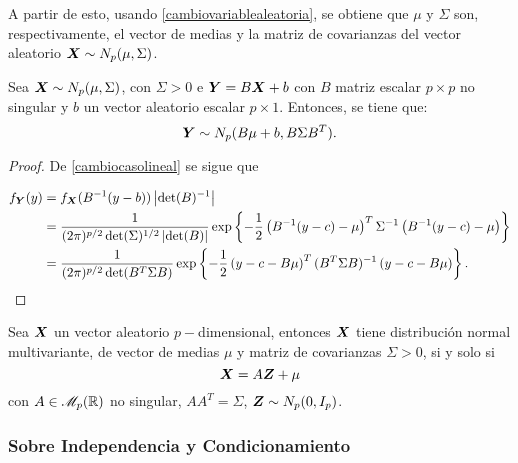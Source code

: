 A partir de esto, usando \ref{cambiovariablealeatoria}, se obtiene que $\mu$ y $\Sigma$ son, respectivamente, el vector de medias y la matriz de covarianzas del vector aleatorio $\boldsymbol{X} \sim N_p(\mu,\Sigma)$.


\begin{nprop} \label{afinnormal}
  Sea $\boldsymbol{X} \sim N_p(\mu,\Sigma)$, con $\Sigma > 0$ e $\boldsymbol{Y} = B\boldsymbol{X}+b$ con $B$ matriz escalar $p\times p$ no singular y $b$ un vector aleatorio escalar $p\times 1$. Entonces, se tiene que:
  \[
     \boldsymbol{Y} \sim N_p(B\mu+b, B \Sigma B^T)
  .\]
\end{nprop}

\begin{proof}
  De \ref{cambiocasolineal} se sigue que

  \[
  \begin{split}
    f_{\boldsymbol{Y}}(y) & = f_{\boldsymbol{X}}(B^{-1}(y-b))\left|\det(B)^{-1}\right| \\
    & = \frac{1}{(2\pi)^{p/2} \det(\Sigma)^{1/2} \left|\det(B)\right|}
    \exp\left\{ -\frac{1}{2} \left(B^{-1}(y-c) - \mu\right)^T \Sigma^{-1} \left(B^{-1}(y-c) - \mu \right) \right\} \\
    & = \frac{1}{(2\pi)^{p/2} \det(B^T\Sigma B)}
    \exp\left\{ -\frac{1}{2} \left(y-c - B\mu\right)^T (B^T\Sigma B)^{-1} \left(y - c - B\mu \right) \right\}.
  \end{split}
  \]
\end{proof}

\begin{nth}
  Sea $\boldsymbol{X}$ un vector aleatorio $p-$dimensional, entonces $\boldsymbol{X}$ tiene distribución normal multivariante, de vector de medias $\mu$ y matriz de covarianzas $\Sigma > 0$, si y solo si
  \[
\boldsymbol{X} = A\boldsymbol{Z} + \mu
\]
con $A\in \mathscr{M}_{p}(\mathbb{R})$ no singular, $AA^T = \Sigma$, $\boldsymbol{Z} \sim N_p(0,I_p)$.
\end{nth}


\subsubsection{Sobre Independencia y Condicionamiento}

